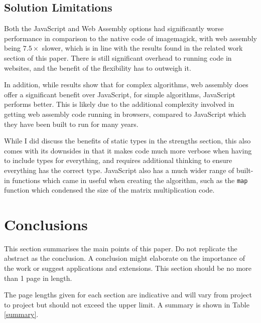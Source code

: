 \documentclass[12pt,a4paper]{article}
\begin{document}
\subsection{Solution Limitations}

Both the JavaScript and Web Assembly options had significantly worse performance in comparison to the native code of imagemagick, with web assembly being $7.5 \times$ slower, which is in line with the results found in the related work section of this paper. There is still significant overhead to running code in websites, and the benefit of the flexibility has to outweigh it.

In addition, while results show that for complex algorithms, web assembly does offer a significant benefit over JavaScript, for simple algorithms, JavaScript performs better. This is likely due to the additional complexity involved in getting web assembly code running in browsers, compared to JavaScript which they have been built to run for many years.

While I did discuss the benefits of static types in the strengths section, this also comes with its downsides in that it makes code much more verbose when having to include types for everything, and requires additional thinking to ensure everything has the correct type. JavaScript also has a much wider range of built-in functions which came in useful when creating the algorithm, such as the \texttt{map} function which condensed the size of the matrix multiplication code.


\newpage
\section{Conclusions}

This section summarises the main points of this paper.  Do not replicate the abstract as the conclusion.  A conclusion might elaborate on the importance of the work or suggest applications and extensions.  This section should be no more than 1 page in length.

The page lengths given for each section are indicative and will vary from project to project but should not exceed the upper limit.  A summary is shown in Table \ref{summary}.
\end{document}
